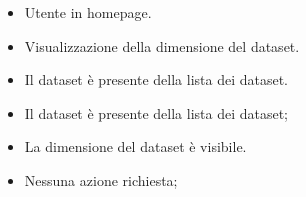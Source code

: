     \UCdsc
    { %
        \begin{itemize}
            \item Utente in homepage.
        \end{itemize}
    }
    { %
        \begin{itemize}
            \item Visualizzazione della dimensione del dataset.
        \end{itemize}
    }
    { %
        \begin{itemize}
            \item Il dataset è presente della lista dei dataset.
        \end{itemize}
    }
    { %
        \begin{itemize}
            \item Il dataset è presente della lista dei dataset;
            \item La dimensione del dataset è visibile.
        \end{itemize}
    }
    { %
        \begin{itemize}
            \item Nessuna azione richiesta;
        \end{itemize}
    }


